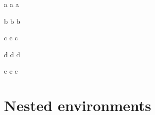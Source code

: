 \documentclass{article}
\begin{document}
\begin{A} %
  a       %
  a       %
  a       %
\end{A}   %
\begin{B} %
  b       %
  b       %
  b       %
\end{B}   %
\begin{C} %
  c       %
  c       %
  c       %
\end{C}   %
\begin{D} %
  d       %
  d       %
  d       %
\end{D}   %
\begin{E} %
  e       %
  e       %
  e       %
\end{E}   %

\section{Nested environments}
\end{document}
